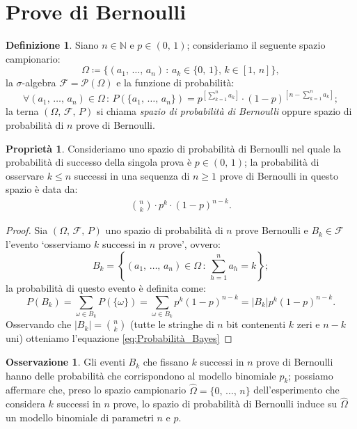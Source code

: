 \documentclass[12pt,openany]{amsbook}
\theoremstyle{plain}
\numberwithin{equation}{section} %
\theoremstyle{definition}
\newtheorem{defn}[thm]{Definizione}
\newtheorem{prty}[thm]{Proprietà}
\newtheorem{obsv}[thm]{Osservazione}
\newcommand\nbdash{\nobreakdash-\hspace{0pt}}
\begin{document}
        \section{Prove di Bernoulli}
            \begin{defn}
                Siano $n \in \mathbb{N}$ e $p \in (0,\,1)$; consideriamo il seguente spazio campionario: \[
                    \Omega \coloneqq \{(a_1,\,\ldots,\,a_n)\,:\,a_k \in \{0,\,1\},\, k \in [1,\,n]\}
                    ,\] la $\sigma$\nbdash algebra $\mathscr{F} = \mathscr{P}(\Omega)$ e la funzione di probabilità: \[
                    \forall (a_1,\, \ldots,\, a_n) \in \Omega \,:\, P(\{a_1,\, \ldots,\, a_n\}) = p^{\left[\sum_{k=1}^{n} a_k\right]} \cdot (1 - p)^{\left[n - \sum_{k=1}^{n} a_k\right]}
                ;\] 
                la terna $(\Omega,\,\mathscr{F},\,P)$ si chiama \textit{spazio di probabilità di Bernoulli} oppure spazio di probabilità di $n$ prove di Bernoulli.
            \end{defn}
            \begin{prty}
                Consideriamo uno spazio di probabilità di Bernoulli nel quale la probabilità di successo della singola prova è $p \in (0,\,1)$; la probabilità di osservare $k \leq n$ successi in una sequenza di $n \geq 1$ prove di Bernoulli in questo spazio è data da:
                \begin{align}\label{eq:Probabilità_Bayes}
                    \binom{n}{k} \cdot p^{k} \cdot (1 - p)^{n-k}
                .
                \end{align}
            \end{prty}
            \begin{proof}
                Sia $(\Omega,\,\mathscr{F},\,P )$ uno spazio di probabilità di $n$ prove Bernoulli e $B_k \in \mathscr{F}$ l'evento `osserviamo $k$ successi in $n$ prove', ovvero: \[
                    B_k = \left\{ (a_1,\, \ldots,\, a_n) \in \Omega \,:\, \sum_{h=1}^{n} a_h = k \right\} 
                ;\] la probabilità di questo evento è definita come: \[
                    P(B_k) = \sum_{\omega \in B_k} P(\{\omega\}) = \sum_{\omega \in B_k} p^{k}(1 - p)^{n - k} = |B_k|p^{k}(1 - p)^{n - k}
                .\] Osservando che $|B_k| = \binom{n}{k}$ (tutte le stringhe di $n$ bit contenenti $k$ zeri e $n - k$ uni) otteniamo l'equazione \eqref{eq:Probabilità_Bayes}
            \end{proof}
        \begin{obsv}
            Gli eventi $B_k$ che fissano $k$ successi in $n$ prove di Bernoulli hanno delle probabilità che corrispondono al modello binomiale $p_k$; possiamo affermare che, preso lo spazio campionario $\hat{\Omega} = \{0,\,\ldots,\,n\}$ dell'esperimento che considera $k$ successi in $n$ prove, lo spazio di probabilità di Bernoulli induce su $\hat{\Omega}$ un modello binomiale di parametri $n$ e $p$.
        \end{obsv} 
\end{document}
